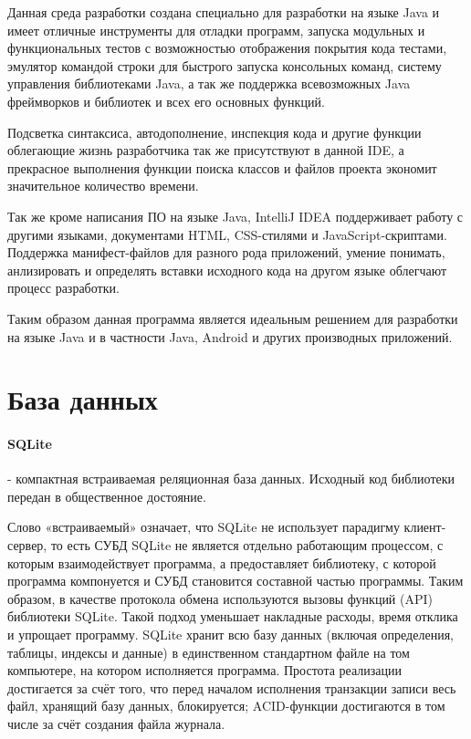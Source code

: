 Данная среда разработки создана специально для разработки на языке Java и имеет отличные инструменты для отладки программ, запуска модульных и функциональных тестов с возможностью отображения покрытия кода тестами, эмулятор командой строки для быстрого запуска консольных команд, систему управления библиотеками Java, а так же поддержка всевозможных Java фреймворков и библиотек и всех его основных функций. 

Подсветка синтаксиса, автодополнение, инспекция кода и другие функции облегающие жизнь разработчика так же присутствуют в данной IDE, а прекрасное выполнения функции поиска классов и файлов проекта экономит значительное количество времени.

Так же кроме написания ПО на языке Java, IntelliJ IDEA поддерживает работу с другими языками, документами HTML, CSS-стилями и JavaScript-скриптами. Поддержка манифест-файлов для разного рода приложений, умение понимать, анлизировать и определять вставки исходного кода на другом языке облегчают процесс разработки.

Таким образом данная программа является идеальным решением для разработки на языке Java и в частности Java, Android и других производных приложений.

\section{База данных}

\paragraph{SQLite} - компактная встраиваемая реляционная база данных. Исходный код библиотеки передан в общественное достояние.

Слово «встраиваемый» означает, что SQLite не использует парадигму клиент-сервер, то есть СУБД SQLite не является отдельно работающим процессом, с которым взаимодействует программа, а предоставляет библиотеку, с которой программа компонуется и СУБД становится составной частью программы. Таким образом, в качестве протокола обмена используются вызовы функций (API) библиотеки SQLite. Такой подход уменьшает накладные расходы, время отклика и упрощает программу. SQLite хранит всю базу данных (включая определения, таблицы, индексы и данные) в единственном стандартном файле на том компьютере, на котором исполняется программа. Простота реализации достигается за счёт того, что перед началом исполнения транзакции записи весь файл, хранящий базу данных, блокируется; ACID-функции достигаются в том числе за счёт создания файла журнала.

